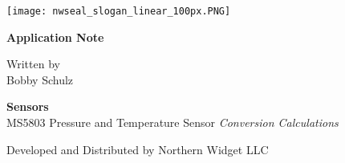 \documentclass[10pt,a4paper]{report}
\begin{document}
\begin{titlepage} %
%
\texttt{[image: nwseal\_slogan\_linear\_100px.PNG]}
%

\Huge
\begin{flushright}
\textbf{Application Note}
\end{flushright}
	\raggedleft %
	
	\vspace*{\baselineskip} %
	
	
	{\Large Written by\\Bobby Schulz} %
	
	\vspace*{0.167\textheight} %
	
	
	\textbf{\LARGE Sensors}\\[\baselineskip] %
	
	MS5803 Pressure and Temperature Sensor 
	{\Large \textit{Conversion Calculations}} %
	
	\vfill %
	
	
	{\large Developed and Distributed by Northern Widget LLC} %
	
	\vspace*{3\baselineskip} %

\end{titlepage}

%
%
\end{document}
